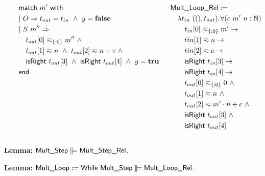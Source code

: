 \documentclass{beamer} %
\renewcommand{\Nat}{\mathbb{N}}
\begin{document}
\begin{frame}
\begin{columns}
\begin{column}{0.5\textwidth}
\begin{align*}
        &\quad\quad \textsf{match}~m'~\textsf{with} \\
        &\quad\quad |~O \Rightarrow t_{out} = t_{in} ~\land~ y=\mathbf{false} \\
        &\quad\quad |~S~m'' \Rightarrow \\
        &\quad\quad\quad t_{out}[0] \eqsim_{\{;0\}} m'' ~\land \\
        &\quad\quad\quad t_{out}[1] \eqsim n ~\land~ t_{out}[2] \eqsim n+c ~\land \\
        &\quad\quad\quad \textsf{isRight}~t_{out}[3] ~\land~ \textsf{isRight}~t_{out}[4] ~\land~ y = \mathbf{true} \\
        &\quad\quad \textsf{end}
      \end{align*}
    \end{column}

    \begin{column}{0.5\textwidth}
      \begin{align*}
        & \MS{Mult\_Loop\_Rel} := \\
        &\quad \lam{t_{in}~(\unit, t_{out})} \forall (c~m'~n:\Nat), \\
        &\quad\quad t_{in}[0] \eqsim_{\{;0\}} m' \rightarrow \\
        &\quad\quad t{in}[1] \eqsim n \rightarrow \\
        &\quad\quad t{in}[2] \eqsim c \rightarrow \\
        &\quad\quad \MS{isRight}~t_{in}[3] \rightarrow \\
        &\quad\quad \MS{isRight}~t_{in}[4] \rightarrow \\
        &\quad\quad t_{out}[0] \eqsim_{\{;0\}} 0 ~\land \\
        &\quad\quad t_{out}[1] \eqsim n ~\land \\
        &\quad\quad t_{out}[2] \eqsim m' \cdot n+c ~\land \\
        &\quad\quad \MS{isRight}~t_{out}[3] ~\land \\
        &\quad\quad \MS{isRight}~t_{out}[4]
      \end{align*}
    \end{column}

  \end{columns}

  \pause

  \textbf{Lemma:}
  $\MS{Mult\_Step} \VDash \MS{Mult\_Step\_Rel}$.

  \pause

  \textbf{Lemma:}
  $\MS{Mult\_Loop} := \MS{While}~\MS{Mult\_Step} \VDash \MS{Mult\_Loop\_Rel}$.
  


\end{frame}
\end{document}
